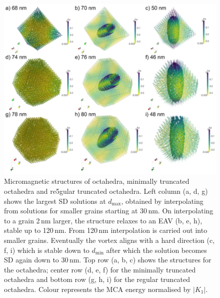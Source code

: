 \documentclass[review,authoryear]{elsarticle}
\newcommand{\dmax}{d_\text{max}}
\newcommand{\dmin}{d_\text{min}}
\newcommand{\nm}{\,\text{nm}}
\begin{document}
\begin{figure}[ht]
\centering
\includegraphics[width=\textwidth]{Figure_04.pdf}
\caption{Micromagnetic structures of octahedra, minimally truncated octahedra and re5gular truncated octahedra. Left column (a, d, g) shows the largest SD solutions at $\dmax$, obtained by interpolating from solutions for smaller grains starting at 30$\nm$. On interpolating to a grain 2$\nm$ larger, the structure relaxes to an EAV (b, e, h), stable up to 120$\nm$. From 120$\nm$ interpolation is carried out into smaller grains. Eventually the vortex aligns with a hard direction (c, f, i) which is stable down to $\dmin$ after which the solution becomes SD again down to 30$\nm$. Top row (a, b, c) shows the structures for the octahedra; center row (d, e, f) for the minimally truncated octahedra and bottom row (g, h, i) for the regular truncated octahedra. Colour represents the MCA energy normalised by $|K_1|$.}
\label{fig4}
\end{figure}
\end{document}
